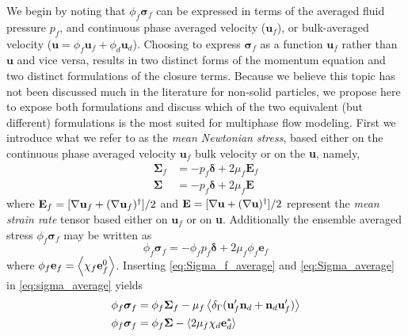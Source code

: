 We begin by noting that $\phi_f\bm\sigma_f$ can be expressed in terms of the averaged fluid pressure $p_f$, and continuous phase averaged velocity ($\textbf{u}_f$), or bulk-averaged velocity ($\textbf{u} = \phi_f \textbf{u}_f + \phi_d \textbf{u}_d$).
Choosing to express $\bm\sigma_f$ as a function $\textbf{u}_f$ rather than $\textbf{u}$ and vice versa, results in two distinct forms of the momentum equation and two distinct formulations of the closure terms. 
Because we believe this topic has not been discussed much in the literature for non-solid particles, we propose here to expose both formulations and discuss which of the two equivalent (but different) formulations is the most suited for multiphase flow modeling. 
First we introduce what we refer to as the \textit{mean Newtonian stress}, based either on the continuous phase averaged velocity $\textbf{u}_f$ bulk velocity or on the \textbf{u}, namely,
\begin{align}
    \bm\Sigma_f 
    &
    = -p_f \bm\delta + 2\mu_f \textbf{E}_f    
    \label{eq:Sigma_f_average}
    \\
    \bm\Sigma &
    = -p_f\bm\delta + 2 \mu_f \textbf{E}
    \label{eq:Sigma_average}
\end{align}
where $\textbf{E}_f = [\mathbf{\nabla} \textbf{u}_f + (\mathbf{\nabla} \textbf{u}_f)^{\dagger}]/2$ and $\textbf{E} =[\mathbf{\nabla} \textbf{u} + (\mathbf{\nabla} \textbf{u})^{\dagger}]/2$ represent the \textit{mean strain rate} tensor based either on $\textbf{u}_f$ or on \textbf{u}. 
Additionally the ensemble averaged stress $\phi_f \bm\sigma_f$ may be written as 
\begin{equation}
    \phi_f \bm\sigma_f = - \phi _f p_f \bm\delta + 2 \mu_ f \phi_f \textbf{e}_f
    \label{eq:sigma_average}
\end{equation}
where $\phi _f \textbf{e}_f = \left<\chi _f \textbf{e}_f^0\right>$. 
Inserting \ref{eq:Sigma_f_average} and \ref{eq:Sigma_average} in  \ref{eq:sigma_average} yields
\begin{align}
    \phi_f \bm\sigma_f 
    &=
    \phi_f \bm\Sigma_f
    - \mu_f \avg{\delta_\Gamma( \textbf{u}_f'  \textbf{n}_d +  \textbf{n}_d \textbf{u}_f' )}
    \label{eq:stress_closure}\\
    \phi_f \bm\sigma_f 
    &=
    \phi_f \bm\Sigma
    - \avg{2\mu_f \chi_d \textbf{e}_d^*}
    \label{eq:stress_closure1}
\end{align}
